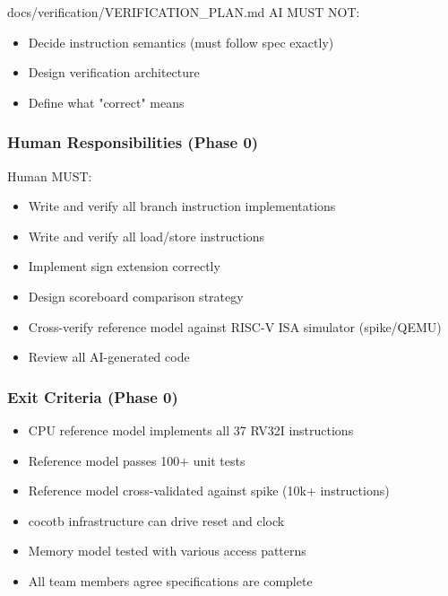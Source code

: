 \begin{relocated}{docs/verification/VERIFICATION_PLAN.md}
AI MUST NOT:

\begin{itemize}
\tightlist
\item
  Decide instruction semantics (must follow spec exactly)
\item
  Design verification architecture
\item
  Define what "correct" means
\end{itemize}

\subsubsection{Human Responsibilities (Phase 0)}\label{ds:ch:verification-plan:human-responsibilities-phase-0}

Human MUST:

\begin{itemize}
\tightlist
\item
  Write and verify all branch instruction implementations
\item
  Write and verify all load/\allowbreak{}store instructions
\item
  Implement sign extension correctly
\item
  Design scoreboard comparison strategy
\item
  Cross-verify reference model against RISC-V ISA simulator
  (spike/\allowbreak{}QEMU)
\item
  Review all AI-generated code
\end{itemize}

\subsubsection{Exit Criteria (Phase 0)}\label{ds:ch:verification-plan:exit-criteria-phase-0}

\begin{itemize}
\tightlist
\item
  \ok{} CPU reference model implements all 37 RV32I instructions
\item
  \ok{} Reference model passes 100+ unit tests
\item
  \ok{} Reference model cross-validated against spike (10k+
  instructions)
\item
  \ok{} cocotb infrastructure can drive reset and clock
\item
  \ok{} Memory model tested with various access patterns
\item
  \ok{} All team members agree specifications are complete
\end{itemize}


\end{relocated}
